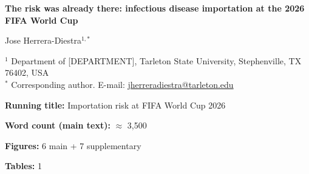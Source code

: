 \documentclass[12pt, a4paper]{article}
\begin{document}
\begin{titlepage}
\begin{center}
{\Large\bfseries The risk was already there: infectious disease
importation at the 2026 FIFA World Cup}

\vspace{1.5cm}

Jose Herrera-Diestra$^{1,*}$

\vspace{0.5cm}

{\small
$^{1}$ Department of [DEPARTMENT], Tarleton State University,
Stephenville, TX 76402, USA\\[4pt]
$^{*}$ Corresponding author.
E-mail: \href{mailto:jherreradiestra@tarleton.edu}{jherreradiestra@tarleton.edu}
}

\vspace{1cm}

\textbf{Running title:} Importation risk at FIFA World Cup 2026

\vspace{0.5cm}

\textbf{Word count (main text):} $\approx$ 3,500

\textbf{Figures:} 6 main + 7 supplementary

\textbf{Tables:} 1
\end{center}
\end{titlepage}

\newpage
\end{document}

